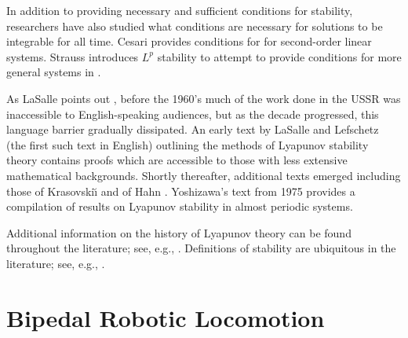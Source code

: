 In addition to providing necessary and sufficient conditions for stability,
researchers have also studied what conditions are necessary for solutions to be
integrable for all time.
%
Cesari provides conditions for \cite[\S 1.5]{Cesari1971} for second-order linear
systems.
%
Strauss introduces $L^{p}$ stability to attempt to provide conditions for more
general systems in \cite{Strauss1965}.

As LaSalle points out \cite{LaSalle1964}, before the 1960's much of the work
done in the USSR was inaccessible to English-speaking audiences, but as the
decade progressed, this language barrier gradually dissipated.
%
An early text by LaSalle and Lefschetz (the first such text in English)
\cite{LaSalle1961} outlining the methods of Lyapunov stability theory contains
proofs which are accessible to those with less extensive mathematical
backgrounds.
%
Shortly thereafter, additional texts emerged including those of Krasovski\u{\i}
\cite{Krasovskii1963} and of Hahn \cite{Hahn1967}.
%
Yoshizawa's text from 1975 \cite{Yoshizawa1975} provides a compilation of
results on Lyapunov stability in almost periodic systems.

Additional information on the history of Lyapunov theory can be found throughout
the literature; see, e.g., \cite{Michel2007,Teel1999}.
%
Definitions of stability are ubiquitous in the literature; see, e.g.,
\cite{Khalil2002,Teschl2012,Vidyasagar1993}.

\section{Bipedal Robotic Locomotion}









